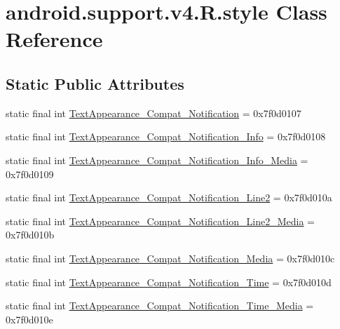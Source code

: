 \hypertarget{classandroid_1_1support_1_1v4_1_1R_1_1style}{}\section{android.\+support.\+v4.\+R.\+style Class Reference}
\label{classandroid_1_1support_1_1v4_1_1R_1_1style}
\subsection*{Static Public Attributes}
\begin{DoxyCompactItemize}
\item 
static final int \mbox{\hyperlink{classandroid_1_1support_1_1v4_1_1R_1_1style_ac94662c8dd52c4f6a0fbee17e0eb54ff}{Text\+Appearance\+\_\+\+Compat\+\_\+\+Notification}} = 0x7f0d0107
\item 
static final int \mbox{\hyperlink{classandroid_1_1support_1_1v4_1_1R_1_1style_a0e51b06e195b1fb1e838fe2f5e7ae7e9}{Text\+Appearance\+\_\+\+Compat\+\_\+\+Notification\+\_\+\+Info}} = 0x7f0d0108
\item 
static final int \mbox{\hyperlink{classandroid_1_1support_1_1v4_1_1R_1_1style_a8dce3afd579fb41d2902a6cef3828673}{Text\+Appearance\+\_\+\+Compat\+\_\+\+Notification\+\_\+\+Info\+\_\+\+Media}} = 0x7f0d0109
\item 
static final int \mbox{\hyperlink{classandroid_1_1support_1_1v4_1_1R_1_1style_a6b4e9488a20b85c43c26d5d77d09b760}{Text\+Appearance\+\_\+\+Compat\+\_\+\+Notification\+\_\+\+Line2}} = 0x7f0d010a
\item 
static final int \mbox{\hyperlink{classandroid_1_1support_1_1v4_1_1R_1_1style_a9605a49d3ebf0803cac79ee89c05d0cb}{Text\+Appearance\+\_\+\+Compat\+\_\+\+Notification\+\_\+\+Line2\+\_\+\+Media}} = 0x7f0d010b
\item 
static final int \mbox{\hyperlink{classandroid_1_1support_1_1v4_1_1R_1_1style_a02c08068d2926ff072a48b5aedb76ebb}{Text\+Appearance\+\_\+\+Compat\+\_\+\+Notification\+\_\+\+Media}} = 0x7f0d010c
\item 
static final int \mbox{\hyperlink{classandroid_1_1support_1_1v4_1_1R_1_1style_aa49cbc625aa81f01d617a7ecdde4aebb}{Text\+Appearance\+\_\+\+Compat\+\_\+\+Notification\+\_\+\+Time}} = 0x7f0d010d
\item 
static final int \mbox{\hyperlink{classandroid_1_1support_1_1v4_1_1R_1_1style_a3af7ceef44d72df72ff3e9f95525a508}{Text\+Appearance\+\_\+\+Compat\+\_\+\+Notification\+\_\+\+Time\+\_\+\+Media}} = 0x7f0d010e

\end{DoxyCompactItemize}
